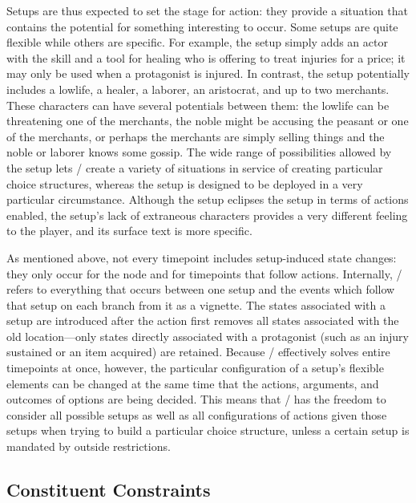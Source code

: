 Setups are thus expected to set the stage for action: they provide a situation that contains the potential for something interesting to occur.
%
Some setups are quite flexible while others are specific.
%
For example, the  setup simply adds an actor with the  skill and a tool for healing who is offering to treat injuries for a price; it may only be used when a protagonist is injured.
%
In contrast, the  setup potentially includes a lowlife, a healer, a laborer, an aristocrat, and up to two merchants.
%
These characters can have several potentials between them: the lowlife can be threatening one of the merchants, the noble might be accusing the peasant or one of the merchants, or perhaps the merchants are simply selling things and the noble or laborer knows some gossip.
%
The wide range of possibilities allowed by the  setup lets \dunyazad/ create a variety of situations in service of creating particular choice structures, whereas the  setup is designed to be deployed in a very particular circumstance.
%
Although the  setup eclipses the  setup in terms of actions enabled, the  setup's lack of extraneous characters provides a very different feeling to the player, and its surface text is more specific.


As mentioned above, not every timepoint includes setup-induced state changes: they only occur for the  node and for timepoints that follow  actions.
%
Internally, \dunyazad/ refers to everything that occurs between one setup and the  events which follow that setup on each branch from it as a vignette.
%
The states associated with a setup are introduced after the  action first removes all states associated with the old location---only states directly associated with a protagonist (such as an injury sustained or an item acquired) are retained.
%
Because \dunyazad/ effectively solves entire timepoints at once, however, the particular configuration of a setup's flexible elements can be changed at the same time that the actions, arguments, and outcomes of options are being decided.
%
This means that \dunyazad/ has the freedom to consider all possible setups as well as all configurations of actions given those setups when trying to build a particular choice structure, unless a certain setup is mandated by outside restrictions.


\subsection{Constituent Constraints}

